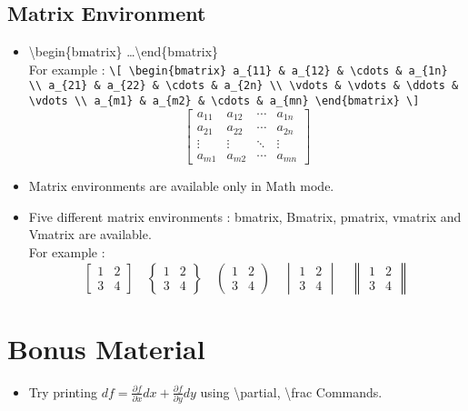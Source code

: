 \documentclass{article}
\begin{document}
\subsection{Matrix Environment}
\begin{itemize}
	\item \textbackslash{}begin\{bmatrix\} \dots \textbackslash{}end\{bmatrix\} \\ For example : \texttt{\textbackslash{}[ \textbackslash{}begin\{bmatrix\} a\_\{11\} \& a\_\{12\} \& \textbackslash{}cdots \& a\_\{1n\} \textbackslash{}\textbackslash{} a\_\{21\} \& a\_\{22\} \& \textbackslash{}cdots \& a\_\{2n\} \textbackslash{}\textbackslash{} \textbackslash{}vdots \& \textbackslash{}vdots \& \textbackslash{}ddots \& \textbackslash{}vdots \textbackslash{}\textbackslash{} a\_\{m1\} \& a\_\{m2\} \& \textbackslash{}cdots \& a\_\{mn\} \textbackslash{}end\{bmatrix\} \textbackslash{}]}\[ \begin{bmatrix} a_{11} & a_{12} & \cdots & a_{1n} \\ a_{21} & a_{22} & \cdots & a_{2n} \\ \vdots & \vdots & \ddots & \vdots \\ a_{m1} & a_{m2} & \cdots & a_{mn} \end{bmatrix} \]
	\item Matrix environments are available only in Math mode.
	\item Five different matrix environments : bmatrix, Bmatrix, pmatrix, vmatrix and Vmatrix are available. \\ For example : \[ \begin{bmatrix} 1 & 2 \\ 3 & 4 \end{bmatrix} \quad \begin{Bmatrix} 1 & 2 \\ 3 & 4 \end{Bmatrix} \quad \begin{pmatrix} 1 & 2 \\ 3 & 4 \end{pmatrix} \quad \begin{vmatrix} 1 & 2 \\ 3 & 4 \end{vmatrix} \quad \begin{Vmatrix} 1 & 2 \\ 3 & 4 \end{Vmatrix} \]
\end{itemize}

\section*{Bonus Material}
\begin{itemize}
	\item Try printing $df = \frac{\partial f}{\partial x}dx +  \frac{\partial f}{\partial y}dy$ using \textbackslash{}partial, \textbackslash{}frac Commands.
\end{itemize}
\end{document}
